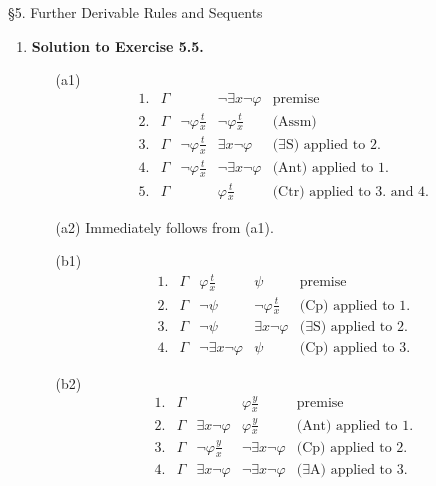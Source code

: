 \ 
\\
\\
{\large \S5. Further Derivable Rules and Sequents}
\begin{enumerate}[1.]
\item \textbf{Solution to Exercise 5.5.}
\begin{itemize}
\item[(a1)]
\[
\begin{array}{lllll}
1. & \Gamma & \, & \neg \exists x \neg \varphi & \mbox{premise} \\
2. & \Gamma & \neg \varphi \frac{t}{x} & \neg \varphi \frac{t}{x} & \mbox{(Assm)} \\
3. & \Gamma & \neg \varphi \frac{t}{x} & \exists x \neg \varphi & \mbox{($\exists$S) applied to 2.} \\
4. & \Gamma & \neg \varphi \frac{t}{x} & \neg \exists x \neg \varphi & \mbox{(Ant) applied to 1.} \\
5. & \Gamma & \, & \varphi \frac{t}{x} & \mbox{(Ctr) applied to 3. and 4.}
\end{array}
\]
\item[(a2)] Immediately follows from (a1).
\item[(b1)]
\[
\begin{array}{lllll}
1. & \Gamma & \varphi \frac{t}{x} & \psi & \mbox{premise} \\
2. & \Gamma & \neg \psi & \neg \varphi \frac{t}{x} & \mbox{(Cp) applied to 1.} \\
3. & \Gamma & \neg \psi & \exists x \neg \varphi & \mbox{($\exists$S) applied to 2.} \\
4. & \Gamma & \neg \exists x \neg \varphi & \psi & \mbox{(Cp) applied to 3.}
\end{array}
\]
\item[(b2)]
\[
\begin{array}{lllll}
1. & \Gamma & \, & \varphi \frac{y}{x} & \mbox{premise} \\
2. & \Gamma & \exists x \neg \varphi & \varphi \frac{y}{x} & \mbox{(Ant) applied to 1.} \\
3. & \Gamma & \neg \varphi \frac{y}{x} & \neg \exists x \neg \varphi & \mbox{(Cp) applied to 2.} \\
4. & \Gamma & \exists x \neg \varphi & \neg \exists x \neg \varphi & \mbox{($\exists$A) applied to 3.} \\

\end{array}\]
\end{itemize}
\end{enumerate}

